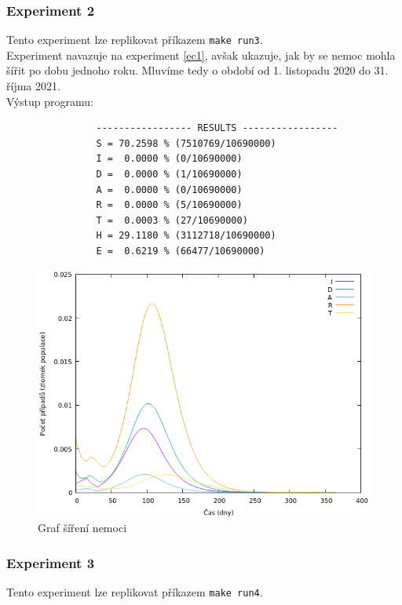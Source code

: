 \documentclass[a4paper,11pt]{article}
\begin{document}
		\subsubsection{Experiment 2}
		\label{ec2}
			Tento experiment lze replikovat příkazem \texttt{make run3}.\\
			
			Experiment navazuje na experiment \ref{ec1}, avšak ukazuje, jak by se nemoc mohla šířit po dobu jednoho roku. Mluvíme tedy o období od 1. listopadu 2020 do 31. říjma 2021.\\
			
			\noindent Výstup programu:
			\begin{verbatim}
				----------------- RESULTS -----------------
				S = 70.2598 % (7510769/10690000)
				I =  0.0000 % (0/10690000)
				D =  0.0000 % (1/10690000)
				A =  0.0000 % (0/10690000)
				R =  0.0000 % (5/10690000)
				T =  0.0003 % (27/10690000)
				H = 29.1180 % (3112718/10690000)
				E =  0.6219 % (66477/10690000)
			\end{verbatim}
		
			\begin{figure}[H]
				\caption{Graf šíření nemoci}
				\label{fig5}
				\centering
				\includegraphics[scale=0.6]{exp_cz2.png}
			\end{figure}
		
		\subsubsection{Experiment 3}
		\label{ec3}
			Tento experiment lze replikovat příkazem \texttt{make run4}.\\
			
\end{document}
